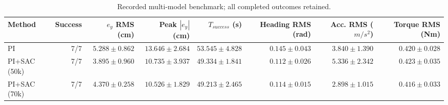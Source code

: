 \begin{table}[ht]
\centering
\caption{Recorded multi-model benchmark; all completed outcomes retained.}
\begin{tabular}{lrrrrrrr}
\toprule
Method & Success & $e_y$ RMS (cm) & Peak $|e_y|$ (cm) & $T_{success}$ (s) & Heading RMS (rad) & Acc. RMS ($m/s^2$) & Torque RMS (Nm) \\
\midrule
PI & 7/7 & $5.288 \pm 0.862$ & $13.646 \pm 2.684$ & $53.545 \pm 4.828$ & $0.145 \pm 0.043$ & $3.840 \pm 1.390$ & $0.420 \pm 0.028$ \\
PI+SAC (50k) & 7/7 & $3.895 \pm 0.960$ & $10.735 \pm 3.937$ & $49.334 \pm 1.841$ & $0.112 \pm 0.026$ & $5.336 \pm 2.342$ & $0.423 \pm 0.035$ \\
PI+SAC (70k) & 7/7 & $4.370 \pm 0.258$ & $10.526 \pm 1.829$ & $49.213 \pm 2.465$ & $0.114 \pm 0.015$ & $2.898 \pm 1.015$ & $0.416 \pm 0.033$ \\
\bottomrule
\end{tabular}
\label{tab:multi_model_benchmark}
\end{table}

